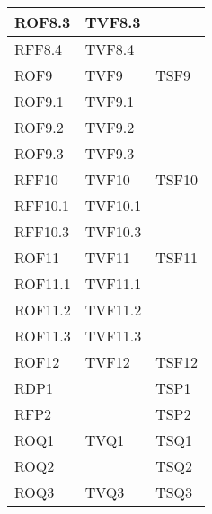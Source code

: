 \begin{center}
\begin{longtable}{| p{4cm} | p{4cm} | p{4cm} |}
	\hline
	\hspace{2 mm} ROF8.3  & TVF8.3 &  \\
	\hline
	\hspace{2 mm} RFF8.4  & TVF8.4 &  \\
	\hline
	ROF9  & TVF9 & TSF9 \\
	\hline
	\hspace{2 mm} ROF9.1  & TVF9.1 &  \\
	\hline
	\hspace{2 mm} ROF9.2  & TVF9.2 &  \\
	\hline
	\hspace{2 mm} ROF9.3  & TVF9.3 &  \\
	\hline
	RFF10  & TVF10 & TSF10 \\
	\hline
	\hspace{2 mm} RFF10.1  & TVF10.1 &  \\
	\hline
	\hspace{2 mm} RFF10.3  & TVF10.3 &  \\
	\hline
	ROF11  & TVF11 & TSF11 \\
	\hline
	\hspace{2 mm} ROF11.1  & TVF11.1 &  \\
	\hline
	\hspace{2 mm} ROF11.2  & TVF11.2 &  \\
	\hline
	\hspace{2 mm} ROF11.3  & TVF11.3 &  \\
	\hline
	ROF12  & TVF12 & TSF12 \\
	\hline

	
	RDP1  &  & TSP1 \\
	\hline
	RFP2  &  & TSP2 \\
	\hline
	
	
	ROQ1  & TVQ1 & TSQ1 \\
	\hline
	ROQ2  &  & TSQ2 \\
	\hline
	ROQ3  & TVQ3 & TSQ3 \\
	\hline
	
	

\end{longtable}
\end{center}
